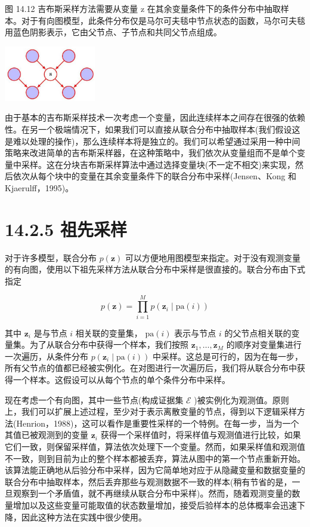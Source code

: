 \documentclass[10pt]{article}
\begin{document}
图 14.12 吉布斯采样方法需要从变量 \(\mathrm{z}\) 在其余变量条件下的条件分布中抽取样本。对于有向图模型，此条件分布仅是马尔可夫毯中节点状态的函数，马尔可夫毯用蓝色阴影表示，它由父节点、子节点和共同父节点组成。

\begin{center}
\includegraphics[max width=0.3\textwidth]{images/0194e279-9b28-703a-88f4-c3ac21e2010d_469_1098_343_455_274_0.jpg}
\end{center}
\hspace*{3em} 

由于基本的吉布斯采样技术一次考虑一个变量，因此连续样本之间存在很强的依赖性。在另一个极端情况下，如果我们可以直接从联合分布中抽取样本(我们假设这是难以处理的操作)，那么连续样本将是独立的。我们可以希望通过采用一种中间策略来改进简单的吉布斯采样器，在这种策略中，我们依次从变量组而不是单个变量中采样。这在分块吉布斯采样算法中通过选择变量块(不一定不相交)来实现，然后依次从每个块中的变量在其余变量条件下的联合分布中采样(Jensen、Kong 和 Kjaerulff，1995)。

\section*{14.2.5 祖先采样}

对于许多模型，联合分布 \(p\left( \mathbf{z}\right)\) 可以方便地用图模型来指定。对于没有观测变量的有向图，使用以下祖先采样方法从联合分布中采样是很直接的。联合分布由下式指定

\[
p\left( \mathbf{z}\right)  = \mathop{\prod }\limits_{{i = 1}}^{M}p\left( {{\mathbf{z}}_{i} \mid  \mathrm{{pa}}\left( i\right) }\right)  \tag{14.47}
\]

其中 \({\mathbf{z}}_{i}\) 是与节点 \(i\) 相关联的变量集， \(\mathrm{{pa}}\left( i\right)\) 表示与节点 \(i\) 的父节点相关联的变量集。为了从联合分布中获得一个样本，我们按照 \({\mathbf{z}}_{1},\ldots ,{\mathbf{z}}_{M}\) 的顺序对变量集进行一次遍历，从条件分布 \(p\left( {{\mathbf{z}}_{i} \mid  \mathrm{{pa}}\left( i\right) }\right)\) 中采样。这总是可行的，因为在每一步，所有父节点的值都已经被实例化。在对图进行一次遍历后，我们将从联合分布中获得一个样本。这假设可以从每个节点的单个条件分布中采样。

现在考虑一个有向图，其中一些节点(构成证据集 \(\mathcal{E}\) )被实例化为观测值。原则上，我们可以扩展上述过程，至少对于表示离散变量的节点，得到以下逻辑采样方法(Henrion，1988)，这可以看作是重要性采样的一个特例。在每一步，当为一个其值已被观测到的变量 \({\mathbf{z}}_{i}\) 获得一个采样值时，将采样值与观测值进行比较，如果它们一致，则保留采样值，算法依次处理下一个变量。然而，如果采样值和观测值不一致，则到目前为止的整个样本都被丢弃，算法从图中的第一个节点重新开始。该算法能正确地从后验分布中采样，因为它简单地对应于从隐藏变量和数据变量的联合分布中抽取样本，然后丢弃那些与观测数据不一致的样本(稍有节省的是，一旦观察到一个矛盾值，就不再继续从联合分布中采样)。然而，随着观测变量的数量增加以及这些变量可能取值的状态数量增加，接受后验样本的总体概率会迅速下降，因此这种方法在实践中很少使用。
\end{document}
